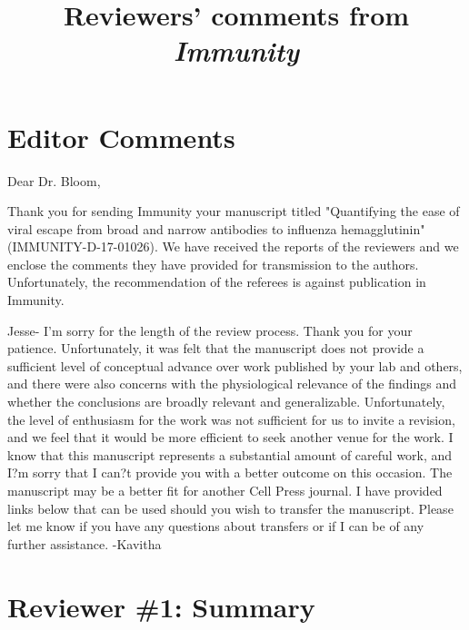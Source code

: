\documentclass[11pt, oneside]{article}   	%
\title{Reviewers' comments from \textit{Immunity}}
\author{}
\begin{document}
\maketitle

\section*{Editor Comments}

Dear Dr. Bloom,

Thank you for sending Immunity your manuscript titled "Quantifying the ease of viral escape from broad and narrow antibodies to influenza hemagglutinin" (IMMUNITY-D-17-01026). We have received the reports of the reviewers and we enclose the comments they have provided for transmission to the authors. Unfortunately, the recommendation of the referees is against publication in Immunity.

Jesse- I'm sorry for the length of the review process. Thank you for your patience. Unfortunately, it was felt that the manuscript does not provide a sufficient level of conceptual advance over work published by your lab and others, and there were also concerns with the physiological relevance of the findings and whether the conclusions are broadly relevant and generalizable. Unfortunately, the level of enthusiasm for the work was not sufficient for us to invite a revision, and we feel that it would be more efficient to seek another venue for the work. I know that this manuscript represents a substantial amount of careful work, and I?m sorry that I can?t provide you with a better outcome on this occasion. The manuscript may be a better fit for another Cell Press journal. I have provided links below that can be used should you wish to transfer the manuscript. Please let me know if you have any questions about transfers or if I can be of any further assistance. -Kavitha

\section*{Reviewer \#1: Summary}
\end{document}
